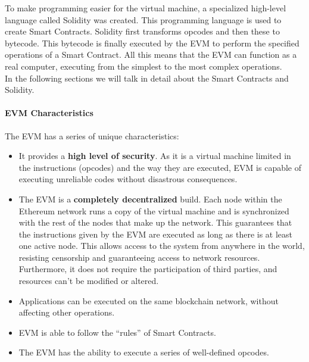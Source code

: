 \documentclass[a4paper, 12pt]{article} %
\begin{document}
                To make programming easier for the virtual machine, a specialized high-level language called Solidity was created. This programming language is used to create Smart Contracts. Solidity first transforms opcodes and then these to bytecode. This bytecode is finally executed by the EVM to perform the specified operations of a  Smart Contract. All this means that the EVM can function as a real computer, executing from the simplest to the most complex operations.\\
                
                In the following sections we will talk in detail about the Smart Contracts and Solidity.
                
            \paragraph{EVM Characteristics}
                The EVM has a series of unique characteristics:
                \begin{itemize}
                    \item It provides a \textbf{high level of security}. As it is a virtual machine limited in the instructions (opcodes) and the way they are executed, EVM is capable of executing unreliable codes without disastrous consequences.
                    \item The EVM is a \textbf{completely decentralized} build. Each node within the Ethereum network runs a copy of the virtual machine and is synchronized with the rest of the nodes that make up the network. This guarantees that the instructions given by the EVM are executed as long as there is at least one active node. This allows access to the system from anywhere in the world, resisting censorship and guaranteeing access to network resources. Furthermore, it does not require the participation of third parties, and resources can’t be modified or altered.
                    \item Applications can be executed on the same blockchain network, without affecting other operations.
                    \item EVM is able to follow the “rules” of Smart Contracts.
                    \item The EVM has the ability to execute a series of well-defined opcodes.
                \end{itemize}
                
\end{document}
